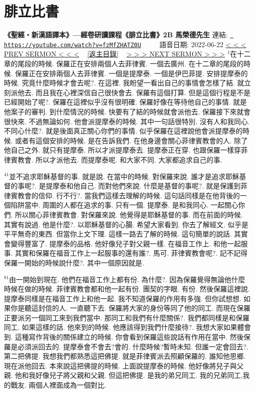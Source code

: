 \documentclass{book}
\begin{document}
\section{腓立比書}
\label{sec:fzMfZHATZ0U}
\textbf{《聖經‧新漢語譯本》—經卷研讀課程《腓立比書》2B 馬榮德先生}
\newline
\newline
連結: \href{https://youtube.com/watch?v=fzMfZHATZ0U}{\texttt{ https://youtube.com/watch?v=fzMfZHATZ0U}} ~~~~ 語音日期: 2022-06-22 
\newline
\newline
\hyperref[sec:XEYwTf6e19I]{\small{< < < PREV SERMON < < <}}
~
\hyperref[sec:index]{\small{[返主目錄]}}
~
\hyperref[sec:FbD104WC_Bk]{\small{> > > NEXT SERMON > > >}}
\newline
\newline
$^{1}$在十二章的尾段的時候.
保羅正在安排兩個人去菲律賓.
一個去廣州.
在十二章的尾段的時候.
保羅正在安排兩個人去菲律賓.
一個是提摩泰.
一個是伊巴菲提.
安排提摩泰的時候.
究竟什麼時候才會去呢?.
在這裡.
我盼望一看出自己的事情會怎樣了結.
就立刻派他去.
而且我在心裡深信自己很快會去.
保羅有這個打算.
但是這個行程是不是已經開始了呢?.
保羅在這裡似乎沒有很明確.
保羅好像在等待他自己的事情.
就是他案子的審判.
到什麼情況的時候.
快要有了結的時候就會派他去.
保羅接下來就會很快來.
不過無論如何.
他會派提摩泰的時候.
其中一句話很特別.
沒有人和我同心.
不同心什麼?.
就是後面真正關心你們的事情.
似乎保羅在這裡說他會派提摩泰的時候.
或者有這個安排的時候.
是在告訴我們.
在他身邊會關心菲律賓教會的人.
除了他自己之外.
就只有提摩泰.
所以才派提摩泰去.
提摩泰正在穿.
也跟保羅一樣穿菲律賓教會.
所以才派他去.
而提摩泰呢.
和大家不同.
大家都追求自己的事.

$^{41}$並不追求耶穌基督的事.
就是說.
在當中的時候.
對保羅來說.
誰才是追求耶穌基督的事呢?.
是提摩泰和他自己.
而對他們來說.
什麼是基督的事呢?.
就是保護到菲律賓教會的信仰.
行不行?.
當我們這樣去理解的時候.
這句話同樣是在他背後的一個陷阱當中.
周圍的人都在追求的事.
只有一個.
提摩泰.
是和我同心.
一起關心你們.
所以關心菲律賓教會.
對保羅來說.
他覺得是耶穌基督的事.
而在前面的時候.
其實有說過.
他是什麼?.
以耶穌基督的心腸.
希望大家看到.
你去了解經文.
似乎是平平無奇的東西.
但當你上文下理.
這樣一路去了解的時候.
這句簡單的說話.
其實會變得豐富了.
提摩泰的品格.
他好像兒子對父親一樣.
在福音工作上.
和他一起服事.
其實和保羅在福音工作上一起服事的還有誰?.
馬可.
菲律賓教會呢?.
記不記得保羅一開始的時候說什麼?.
其中一個原因就是.

$^{81}$由一開始到現在.
他們在福音工作上都有份.
為什麼?.
因為保羅覺得無論他什麼時候在做的時候.
菲律賓教會都和他一起有份.
團契的字眼.
有份.
然後保羅這裡說.
提摩泰同樣是在福音工作上和他一起.
我不知道保羅的作用有多強.
但你試想想.
如果你是聽這封信的人.
一直聽下去.
保羅將大家的身份等同了他的同工.
而現在保羅正要派另一個同工來到我們當中.
那同工和我們有什麼關係?.
我們都同樣是和保羅同工.
如果這樣的話.
他來到的時候.
他應該得到我們什麼接待?.
我想大家如果體會到.
這種寫作背後的關係建立的時候.
你會看到保羅這些說話有作用在當中.
然後保羅是必須派回去的.
提摩泰會不會去?會的.
什麼時候?暫時未知.
但誰一定會回去?.
第二把佛提.
我想我們都熟悉這把佛提.
就是菲律賓派去照顧保羅的.
誰知他思鄉.
現在派他回去.
本來說這把佛提的時候.
上面說提摩泰的時候.
他好像將兒子與父親.
他和我好像兒子將父親和父親.
但這把佛提.
是我的弟兄同工.
我的兄弟同工,我的戰友.
兩個人裡面成為一個對比.
\end{document}
